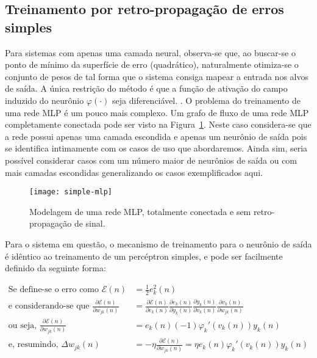 \subsection{Treinamento por retro-propagação de erros simples}

Para sistemas com apenas uma camada neural, observa-se que, ao buscar-se o
ponto de mínimo da superfície de erro (quadrático), naturalmente otimiza-se o
conjunto de pesos de tal forma que o sistema consiga mapear a entrada nos
alvos de saída. A única restrição do método é que a função de ativação do
campo induzido do neurônio $\varphi(\cdot)$ seja diferenciável.
\cite{rosenblatt}. O problema do treinamento de uma rede MLP é um pouco mais
complexo. Um grafo de fluxo de uma rede MLP completamente conectada pode ser
visto na Figura~\ref{fig:simple-mlp}. Neste caso considera-se que a rede
possui apenas uma camada escondida e apenas um neurônio de saída pois se
identifica intimamente com os casos de uso que abordaremos. Ainda sim, seria
possível considerar casos com um número maior de neurônios de saída ou com
mais camadas escondidas generalizando os casos exemplificados aqui.

\begin{figure}
\begin{center}
\texttt{[image: simple-mlp]}
\end{center}
\caption{Modelagem de uma rede MLP, totalmente conectada e sem
retro-propagação de sinal.}
\label{fig:simple-mlp}
\end{figure}

Para o sistema em questão, o mecanismo de treinamento para o neurônio de saída
é idêntico ao treinamento de um percéptron simples, e pode ser facilmente
definido da seguinte forma:

\begin{align}
\text{Se define-se o erro como } \mathcal{E}(n) &= \frac{1}{2}e_{k}^{2}(n)
\label{eq:error-def} \\
\text{e considerando-se que } \frac{\partial\mathcal{E}(n)}{\partial
w_{jk}(n)} &= \frac{\partial\mathcal{E}(n)}{\partial e_k(n)} \frac{\partial
e_k(n)}{\partial y_k(n)} \frac{\partial y_k(n)}{\partial v_k(n)}
\frac{\partial v_k(n)}{\partial w_{jk}(n)} \label{eq:partials} \\
\text{ou seja, } \frac{\partial\mathcal{E}(n)}{\partial
w_{jk}(n)} &= e_k(n)(-1)\varphi_{k}'(v_{k}(n))y_{k}(n)
\label{eq:partials-solution} \\
\text{e, resumindo, } \Delta w_{jk}(n) &=
-\eta\frac{\partial\mathcal{E}(n)}{\partial w_{jk}(n)} = \eta
e_{k}(n)\varphi_{k}'(v_{k}(n))y_{k}(n)
\end{align}


